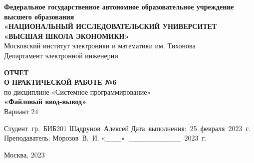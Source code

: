 \begin{titlepage}
    \begin{center}

        \timesfont
        {\large\bf\timesfont Федеральное‌ ‌государственное‌ ‌автономное‌ ‌образовательное‌ ‌учреждение‌ ‌высшего‌ образования\\}
        {\large\bf\timesfont «НАЦИОНАЛЬНЫЙ‌ ‌ИССЛЕДОВАТЕЛЬСКИЙ‌ ‌УНИВЕРСИТЕТ‌ «ВЫСШАЯ‌ ‌ШКОЛА‌ ‌ЭКОНОМИКИ»‌\\}
        Московский‌ ‌институт‌ ‌электроники‌ ‌и‌ ‌математики‌ ‌им. Тихонова‌\\
        Департамент‌ ‌электронной‌ ‌инженерии‌\\

        \vfill
        \vfill

        {\bf\timesfont ОТЧЕТ \\
            О ПРАКТИЧЕСКОЙ РАБОТЕ №6}\\
        по дисциплине «Системное программирование»\\
        {\bf\timesfont «Файловый ввод-вывод»}\\
        Вариант 24\\


        \vfill
        \vfill
        \vfill

        \hfill\vbox
        {
            \hbox{Студент гр. БИБ201}
            \hbox{Шадрунов Алексей}
            \hbox{Дата выполнения: 25 февраля 2023 г.}
            \hbox{}
            \hbox{Преподаватель:}
            \hbox{Морозов В. И.}
            \hbox{«\_\_\_» \_\_\_\_\_\_\_\_\_\_ 2023 г.}
        }

        \vfill

        Москва, 2023
    \end{center}
\end{titlepage}
